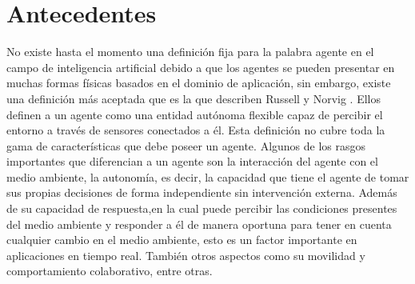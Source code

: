 \documentclass[final,6p,times,twocolumn]{elsarticle}
\begin{document}






\section{Antecedentes}
No existe hasta el momento una definición fija para la palabra agente en el campo de inteligencia artificial debido a que los agentes se pueden presentar en muchas formas físicas basados en el dominio de aplicación, sin embargo, existe una definición más aceptada que es la que describen Russell y Norvig \cite{Parasumanna}. Ellos definen a un agente como una entidad autónoma flexible capaz de percibir el entorno a través de sensores conectados a él. Esta definición no cubre toda la gama de características que debe poseer un agente. Algunos de los rasgos importantes que diferencian a un agente son la interacción del agente con el medio ambiente, la autonomía, es decir, la capacidad que tiene el agente de tomar sus propias decisiones de forma independiente sin intervención externa. Además de su capacidad de respuesta,en la cual puede percibir las condiciones presentes del medio ambiente y responder a él de manera oportuna para tener en cuenta cualquier cambio en el medio ambiente, esto es un factor importante en aplicaciones en tiempo real. También otros aspectos como su movilidad y comportamiento colaborativo, entre otras. 

\label{S:2}
\end{document}
